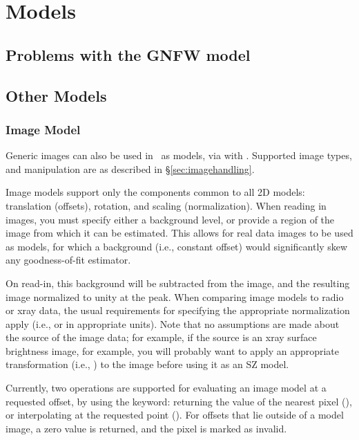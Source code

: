 \section{Models}


\subsection{Problems with the GNFW model}
\label{sec:ss}


\subsection{Other Models}

\subsubsection{Image Model}

Generic images can also be used in \climax\ as models, via
 with .  Supported image types,
and manipulation are as described in \S\ref{sec:imagehandling}.

Image models support only the components common to all 2D models:
translation (offsets), rotation, and scaling (normalization).  When
reading in images, you must specify either a background level, or
provide a region of the image from which it can be estimated.  This
allows for real data images to be used as models, for which a
background (i.e., constant offset) would significantly skew any
goodness-of-fit estimator.  

On read-in, this background will be subtracted from the image, and the
resulting image normalized to unity at the peak.  When comparing image
models to radio or xray data, the usual requirements for specifying
the appropriate normalization apply (i.e.,  or
 in appropriate units).  Note that no assumptions are made
about the source of the image data; for example, if the source is an
xray surface brightness image, for example, you will probably want to
apply an appropriate transformation (i.e., ) to the image
before using it as an SZ model.

Currently, two operations are supported for evaluating an image model
at a requested offset, by using the  keyword: returning the
value of the nearest pixel (), or interpolating
at the requested point ().  For offsets that
lie outside of a model image, a zero value is returned, and the pixel
is marked as invalid.  

